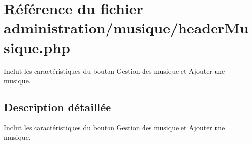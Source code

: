 \hypertarget{headerMusique_8php}{}\section{Référence du fichier administration/musique/header\+Musique.php}
\label{headerMusique_8php}


Inclut les caractéristiques du bouton Gestion des musique et Ajouter une musique.  




\subsection{Description détaillée}
Inclut les caractéristiques du bouton Gestion des musique et Ajouter une musique. 

